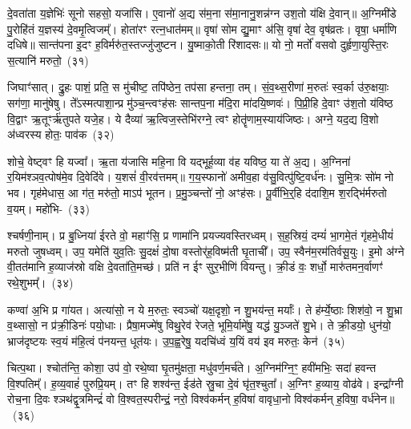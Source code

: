 दे॒वता॑ता य॒ज्ञेभिः॑ सूनो सहसो॒ यजा॑सि। ए॒वानो॑ अ॒द्य स॑म॒ना स॑मा॒नानु॒शन्न॑ग्न उश॒तो य॑क्षि दे॒वान्॥ अ॒ग्निमी॑डे पु॒रोहि॑तं य॒ज्ञस्य॑ दे॒वमृ॒त्विजम्᳚। होता॑रꣳ रत्न॒धात॑मम्॥ वृषा॑ सोम द्यु॒माꣳ अ॑सि॒ वृषा॑ देव॒ वृष॑व्रतः। वृषा॒ धर्मा॑णि दधिषे॥ सान्त॑पना इ॒दꣳ ह॒विर्मरु॑त॒स्तज्जु॑जुष्टन। यु॒ष्माको॒ती रि॑शादसः॥ यो नो॒ मर्तो॑ वसवो दुर्\mbox{}हृणा॒युस्ति॒रः स॒त्यानि॑ मरुतो॒~(३१)

जिघाꣳ॑सात्। द्रु॒हः पाशं॒ प्रति॒ स मु॑चीष्ट॒ तपि॑ष्ठेन॒ तप॑सा हन्तना॒ तम्। सं॒व॒थ्स॒रीणा॑ म॒रुतः॑ स्व॒र्का उ॑रु॒क्षयाः॒ सग॑णा॒ मानु॑षेषु। ते᳚\-ऽस्मत्पाशा॒न्प्र मु॑ञ्च॒न्त्वꣳह॑सः सान्तप॒ना म॑दि॒रा मा॑दयि॒ष्णवः॑। पि॒प्री॒हि दे॒वाꣳ उ॑श॒तो य॑विष्ठ वि॒द्वाꣳ ऋ॒तूꣳर्\mbox{}ऋ॑तुपते यजे॒ह। ये दैव्या॑ ऋ॒त्विज॒स्तेभि॑रग्ने॒ त्वꣳ होतॄ॑णाम॒स्याय॑जिष्ठः। अग्ने॒ यद॒द्य वि॒शो अ॑ध्वरस्य होतः॒ पाव॑क~(३२)

शोचे॒ वेष्ट्वꣳ हि यज्वा᳚। ऋ॒ता य॑जासि महि॒ना वि यद्भूर्\mbox{}ह॒व्या व॑ह यविष्ठ॒ या ते॑ अ॒द्य। अ॒ग्निना॑ र॒यिम॑श्ञव॒त्पोष॑मे॒व दि॒वेदि॑वे। य॒शसं॑ वी॒रव॑त्तमम्॥ ग॒य॒स्फानो॑ अमीव॒हा व॑सु॒वित्पु॑ष्टि॒वर्ध॑नः। सु॒मि॒त्रः सो॑म नो भव। गृह॑मेधास॒ आ ग॑त॒ मरु॑तो॒ माऽप॑ भूतन। प्र॒मु॒ञ्चन्तो॑ नो॒ अꣳह॑सः। पू॒र्वीभि॒र्॒\mbox{}हि द॑दाशि॒म श॒रद्भि॑र्मरुतो व॒यम्। महो॑भि-~(३३)

श्चर्\mbox{}षणी॒नाम्। प्र बु॒ध्निया॑ ईरते वो॒ महाꣳ॑सि॒ प्र णामा॑नि प्रयज्यवस्तिरध्वम्। स॒ह॒स्रियं॒ दम्यं॑ भा॒गमे॒तं गृ॑हमे॒धीयं॑ मरुतो जुषध्वम्। उप॒ यमेति॑ युव॒तिः सु॒दक्षं॑ दो॒षा वस्तोर्॑\mbox{}ह॒विष्म॑ती घृ॒ताची᳚। उप॒ स्वैन॑म॒रम॑तिर्वसू॒युः। इ॒मो अ॑ग्ने वी॒तत॑मानि ह॒व्याज॑स्रो वक्षि दे॒वता॑ति॒मच्छ॑। प्रति॑ न ईꣳ सुर॒भीणि॑ वियन्तु। क्री॒डं वः॒ शर्धो॒ मारु॑तमन॒र्वाणꣳ॑ रथे॒शुभम्᳚।~(३४)

कण्वा॑ अ॒भि प्र गा॑यत। अत्या॑सो॒ न ये म॒रुतः॒ स्वञ्चो॑ यक्ष॒दृशो॒ न शु॒भय॑न्त॒ मर्याः᳚। ते ह॑र्म्ये॒ष्ठाः शिश॑वो॒ न शु॒भ्रा व॒थ्सासो॒ न प्र॑क्री॒डिनः॑ पयो॒धाः। प्रैषा॒मज्मे॑षु विथु॒रेव॑ रेजते॒ भूमि॒र्यामे॑षु॒ यद्ध॑ यु॒ञ्जते॑ शु॒भे। ते क्री॒डयो॒ धुन॑यो॒ भ्राज॑दृष्टयः स्व॒यं म॑हि॒त्वं प॑नयन्त॒ धूत॑यः। उ॒प॒ह्व॒रेषु॒ यदचि॑ध्वं य॒यिं वय॑ इव मरुतः॒ केन॑~(३५)

चित्प॒था। श्चोत॑न्ति॒ कोशा॒ उप॑ वो॒ रथे॒ष्वा घृ॒तमु॑क्षता॒ मधु॑वर्ण॒मर्च॑ते। अ॒ग्निम॑ग्नि॒ꣳ॒ हवी॑मभिः॒ सदा॑ हवन्त वि॒श्पतिम्᳚। ह॒व्य॒वाहं॑ पुरुप्रि॒यम्। तꣳ हि शश्व॑न्त॒ ईड॑ते स्रु॒चा दे॒वं घृ॑त॒श्चुता᳚। अ॒ग्निꣳ ह॒व्याय॒ वोढ॑वे। इन्द्रा᳚ग्नी रोच॒ना दि॒वः श्ञथ॑द्वृ॒त्रमिन्द्रं॑ वो वि॒श्वत॒स्परीन्द्रं॒ नरो॒ विश्व॑कर्मन् ह॒विषा॑ वावृधा॒नो विश्व॑कर्मन् ह॒विषा॒ वर्ध॑नेन॥~(३६)

{\anuvakamend[{सूर्य॑स्य॒ मनु॑षो मरुतः॒ पाव॑क॒ महो॑भी रथे॒शुभं॒ केन॒ षट्च॑त्वारिꣳशच्च}]}%

